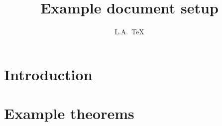 \documentclass{exam}
\author{L.A.\ TeX}
\title{Example document setup}
\theoremstyle{definition}
\begin{document}
    \maketitle

    \section{Introduction}\label{sec:introduction}
%    

    \section{Example theorems} \label{sec:exampleTheorem}
%    
\end{document}
